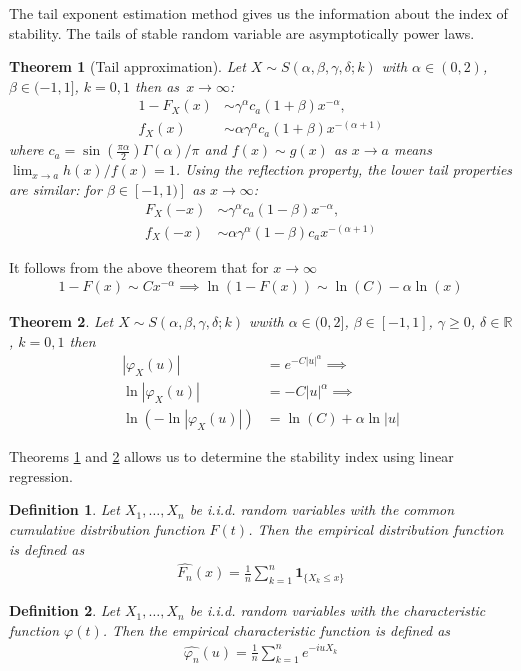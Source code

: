 \documentclass{article}
\newtheorem{theorem}{Theorem}
\newtheorem{definition}{Definition}
\begin{document}
		The tail exponent estimation method gives us the information
		about the index of stability. The tails of stable random variable are asymptotically power laws. 
		\begin{theorem}[Tail approximation] Let $X \sim S(\alpha, \beta , \gamma, \delta; k)$ with $\alpha \in (0,2)$, $\beta \in (-1,1]$, $k=0,1$ then as~$x\to \infty$:
			\label{theorem:Tail approximation}
			\begin{align*}
				1 - F_X(x) &\sim \gamma^\alpha c_a (1+\beta)x^{-\alpha},\\
				f_X(x) &\sim \alpha \gamma^\alpha c_a (1+\beta) x^{-(\alpha + 1)}
			\end{align*}
			where $c_a = \sin(\frac{\pi\alpha}{2})\Gamma(\alpha)/\pi$ and $f(x)\sim g(x)$ as $x\to a$ means $\lim_{x\to a} h(x)/f(x) = 1$. Using the reflection property, the lower tail properties are
			similar: for $\beta\in[-1,1)]$ as $x \to \infty$:
			\begin{align*}
				F_X(-x) &\sim  \gamma^\alpha c_a (1-\beta)x^{-\alpha},\\
				f_X(-x) &\sim  \alpha \gamma^\alpha (1-\beta)c_a x^{-(\alpha + 1)}
			\end{align*}
		\end{theorem}
		It follows from the above theorem that for $x\to\infty$
		\begin{gather}\label{Tail approximation polifit}
			1 - F(x) \sim Cx^{-\alpha} \implies \ln(1-F(x)) \sim \ln(C) -\alpha \ln(x)
		\end{gather}

		\begin{theorem}  Let $X \sim S(\alpha, \beta , \gamma, \delta; k)$ wwith $\alpha \in (0,2]$, $\beta \in [-1,1]$, $\gamma \ge 0$, $\delta\in\mathbb{R}$, $k=0,1$ then
			\label{theorem:CF}
			\begin{align*}
				|\varphi_X(u)| &= e^{-C|u|^\alpha} \implies \\
				\ln |\varphi_X(u)| &= -C|u|^\alpha \implies \\
				\ln(-\ln |\varphi_X(u)|) &= \ln(C) + \alpha\ln|u|
			\end{align*}
		\end{theorem}
		Theorems \ref{theorem:Tail approximation} and \ref{theorem:CF} allows us to determine the stability index using linear regression.

		\begin{definition}Let $X_1,\dots, X_n$ be i.i.d. random variables with the common cumulative distribution function $F(t)$. 
			Then the empirical distribution function is defined as
			\begin{gather*}
				\hat{F_n}(x) = \frac{1}{n}\sum_{k = 1}^{n}\mathbf{1}_{\{X_k \le x\}}
			\end{gather*}
		\end{definition}
		\begin{definition}Let $X_1,\dots, X_n$ be i.i.d. random variables with the characteristic function $\varphi(t)$. 
			Then the empirical characteristic function is defined as
			\begin{gather*}
				\hat{\varphi_n}(u) = \frac{1}{n}\sum_{k = 1}^{n}e^{-i u X_k}
			\end{gather*}
		\end{definition}
\end{document}

